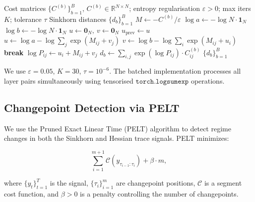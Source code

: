 \documentclass[12pt,twoside]{article}
\newcommand{\R}{\mathbb{R}}
\begin{document}
\begin{algorithm}[t]
  \caption{Log-domain Sinkhorn--Knopp (batched)}
  \label{alg:sinkhorn}
  \begin{algorithmic}[1]
    \Require Cost matrices \(\{C^{(b)}\}_{b=1}^B\), \(C^{(b)} \in \R^{N\times N}\);
    entropy regularisation \(\varepsilon > 0\); max iters \(K\); tolerance \(\tau\)
    \Ensure Sinkhorn distances \(\{d_b\}_{b=1}^B\)
      \State \(M \gets -C^{(b)} / \varepsilon\) 
      \State \(\log a \gets -\log N \cdot \mathbf{1}_N\) 
      \State \(\log b \gets -\log N \cdot \mathbf{1}_N\) 
      \State \(u \gets \mathbf{0}_N,\ v \gets \mathbf{0}_N\)
        \State \(u_{\text{prev}} \gets u\)
        \State \(u \gets \log a - \log\sum_j \exp(M_{ij} + v_j)\)
        \State \(v \gets \log b - \log\sum_i \exp(M_{ij} + u_i)\)
          \State \textbf{break}
        \EndIf
      \EndFor
      \State \(\log P_{ij} \gets u_i + M_{ij} + v_j\) 
      \State \(d_b \gets \sum_{i,j} \exp(\log P_{ij}) \cdot C^{(b)}_{ij}\)
    \EndFor
    \State \Return \(\{d_b\}_{b=1}^B\)
  \end{algorithmic}
\end{algorithm}

We use \(\varepsilon = 0.05\), \(K = 30\), \(\tau = 10^{-6}\). The batched
implementation processes all layer pairs simultaneously using tensorised
\(\texttt{torch.logsumexp}\) operations.

\subsection{Changepoint Detection via PELT}

We use the Pruned Exact Linear Time (PELT) algorithm
\citep{killick2012optimal} to detect regime changes in both the Sinkhorn
and Hessian trace signals. PELT minimizes:

\begin{equation}
  \sum_{i=1}^{m+1} \mathcal{C}(y_{\tau_{i-1}:\tau_i}) + \beta \cdot m,
  \label{eq:pelt}
\end{equation}

where \(\{y_t\}_{t=1}^T\) is the signal, \(\{\tau_i\}_{i=1}^m\) are changepoint
positions, \(\mathcal{C}\) is a segment cost function, and \(\beta > 0\) is a
penalty controlling the number of changepoints.
\end{document}
